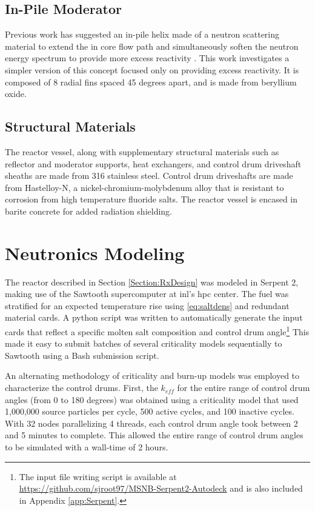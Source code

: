 \subsection{In-Pile Moderator}
Previous work has suggested an in-pile helix made of a neutron scattering material to extend the in core flow path and simultaneously soften the neutron energy spectrum to provide more excess reactivity \cite{CarterPHD}. This work investigates a simpler version of this concept focused only on providing excess reactivity. It is composed of 8 radial fins spaced 45 degrees apart, and is made from beryllium oxide.

\subsection{Structural Materials}
The reactor vessel, along with supplementary structural materials such as reflector and moderator supports, heat exchangers, and control drum driveshaft sheaths are made from 316 stainless steel. Control drum driveshafts are made from Hastelloy-N, a nickel-chromium-molybdenum alloy that is resistant to corrosion from high temperature fluoride salts. The reactor vessel is encased in barite concrete for added radiation shielding.

\section{Neutronics Modeling}\label{Section:Serpent}
The reactor described in Section \ref{Section:RxDesign} was modeled in Serpent 2, making use of the Sawtooth supercomputer at \acs{inl}'s \acs{hpc} center. The fuel was stratified for an expected temperature rise using \ref{eq:saltdens} and redundant material cards. A python script was written to automatically generate the input cards that reflect a specific molten salt composition and control drum angle\footnote{The input file writing script is available at \href{https://github.com/sjroot97/MSNB-Serpent2-Autodeck}{https://github.com/sjroot97/MSNB-Serpent2-Autodeck} and is also included in Appendix \ref{app:Serpent}.} This made it easy to submit batches of several criticality models sequentially to Sawtooth using a Bash submission script.

 An alternating methodology of criticality and burn-up models was employed to characterize the control drums. First, the $k_{eff}$ for the entire range of control drum angles (from 0 to 180 degrees) was obtained using a criticality model that used 1,000,000 source particles per cycle, 500 active cycles, and 100 inactive cycles. With 32 nodes parallelizing 4 threads, each control drum angle took between 2 and 5 minutes to complete. This allowed the entire range of control drum angles to be simulated with a wall-time of 2 hours.  

